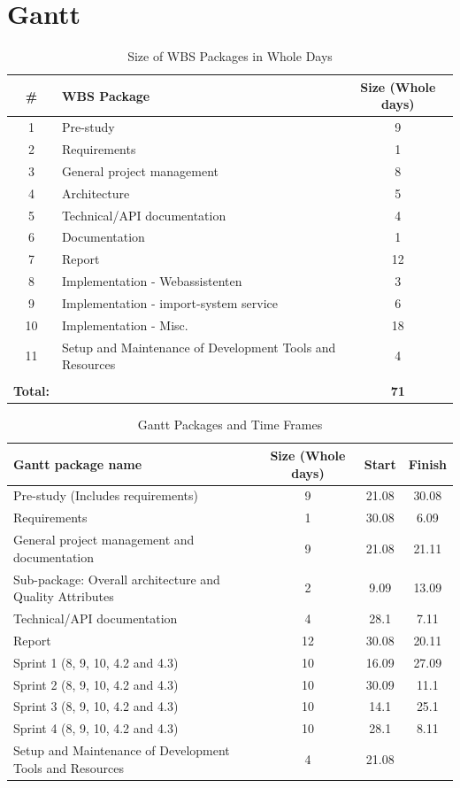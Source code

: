 \section{Gantt}
\begin{table}[H]
\centering
\begin{tabular}{|c|p{8cm}|c|}
\hline
\textbf{\#} & \textbf{WBS Package} & \textbf{Size (Whole days)}\\ 
\hline
1 & Pre-study & 9\\ 
\hline
2 & Requirements & 1\\ 
\hline
3 & General project management & 8\\ 
\hline
4 & Architecture & 5\\ 
\hline
5 & Technical/API documentation & 4\\ 
\hline
6 & Documentation & 1\\ 
\hline
7 & Report & 12\\ 
\hline
8 & Implementation - Webassistenten & 3\\ 
\hline
9 & Implementation - import-system service & 6\\ 
\hline
10 & Implementation - Misc. & 18\\ 
\hline
11 & Setup and Maintenance of Development Tools and Resources & 4\\ 
\hline
 &  & \\ 
\hline
\textbf{Total:} &  & \textbf{71}\\ 
\hline\end{tabular}
\label{table:WBSdays}
\caption{\small{Size of WBS Packages in Whole Days}} 
\end{table}

\hspace{-5cm}
\begin{table}[H]
\centering
\begin{tabular}{|p{6cm}|c|c|c|}
\hline
\textbf{Gantt package name} & \textbf{Size (Whole days)} & \textbf{Start} & \textbf{Finish}\\ 
\hline
Pre-study (Includes requirements) & 9 & 21.08 & 30.08\\ 
\hline
Requirements & 1 & 30.08 & 6.09\\ 
\hline
General project management and documentation & 9 & 21.08 & 21.11\\ 
\hline
Sub-package: Overall architecture and Quality Attributes & 2 & 9.09 & 13.09\\ 
\hline
Technical/API documentation & 4 & 28.1 & 7.11\\ 
\hline
Report & 12 & 30.08 & 20.11\\ 
\hline
Sprint 1 (8, 9, 10, 4.2 and 4.3) & 10 & 16.09 & 27.09\\ 
\hline
Sprint 2 (8, 9, 10, 4.2 and 4.3) & 10 & 30.09 & 11.1\\ 
\hline
Sprint 3 (8, 9, 10, 4.2 and 4.3) & 10 & 14.1 & 25.1\\ 
\hline
Sprint 4 (8, 9, 10, 4.2 and 4.3) & 10 & 28.1 & 8.11\\ 
\hline
Setup and Maintenance of Development Tools and Resources & 4 & 21.08 & \\ 
\hline
\end{tabular}
\label{GanttPackages}
\caption{\small{Gantt Packages and Time Frames}} 
\end{table}

